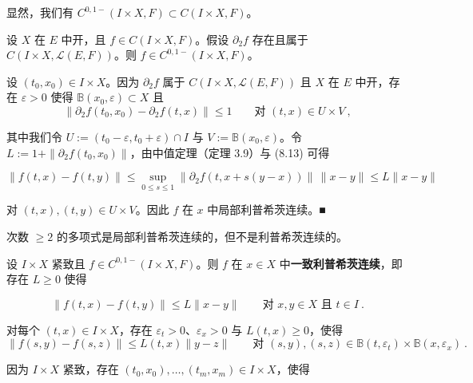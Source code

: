 \begin{remark}

\begin{items}
\item

显然，我们有 $ C^{0,1-}(I\times X,F)\subset C(I\times X,F) $。

\item

设 $ X $ 在 $ E $ 中开，且 $ f\in C(I\times X,F) $。假设 $ \partial_{2}f $ 存在且属于 $ C(I\times X,\mathcal{L}(E,F)) $。则 $ f\in C^{0,1-}(I\times X,F) $。

\proofhead
设 $ (t_{0},x_{0})\in I\times X $。因为 $ \partial_{2}f $ 属于 $ C(I\times X,\mathcal{L}(E,F)) $ 且 $ X $ 在 $ E $ 中开，存在 $ \varepsilon>0 $ 使得 $ \mathbb{B}(x_{0},\varepsilon)\subset X $ 且
\begin{equation}
\|\partial_{2}f(t_{0},x_{0})-\partial_{2}f(t,x)\|\le 1\qquad\text{对 }(t,x)\in U\times V\ ,\tag{8.13}
\end{equation}

其中我们令 $ U:=(t_{0}-\varepsilon,t_{0}+\varepsilon)\cap I $ 与 $ V:=\mathbb{B}(x_{0},\varepsilon) $。令 $ L:=1+\|\partial_{2}f(t_{0},x_{0})\| $，由中值定理（定理 3.9）与 (8.13) 可得

\[
\|f(t,x)-f(t,y)\|\le\sup_{0\le s\le 1}\|\partial_{2}f(t,x+s(y-x))\|\,\|x-y\|\le L\|x-y\|
\]

对 $ (t,x),(t,y)\in U\times V $。因此 $ f $ 在 $ x $ 中局部利普希茨连续。\nobreak\hspace{0.35em}■

\item

次数 $ \ge 2 $ 的多项式是局部利普希茨连续的，但不是利普希茨连续的。

\item

设 $ I\times X $ 紧致且 $ f\in C^{0,1-}(I\times X,F) $。则 $ f $ 在 $ x\in X $ 中\textbf{一致利普希茨连续}，即存在 $ L\ge 0 $ 使得

\[
\|f(t,x)-f(t,y)\|\le L\|x-y\|\qquad\text{对 }x,y\in X\text{ 且 }t\in I \ .
\]

\proofhead
对每个 $ (t,x)\in I\times X $，存在 $ \varepsilon_{t}>0 $、$ \varepsilon_{x}>0 $ 与 $ L(t,x)\ge 0 $，使得
\[
\|f(s,y)-f(s,z)\|\le L(t,x)\|y-z\|\qquad\text{对 }(s,y),(s,z)\in\mathbb{B}(t,\varepsilon_{t})\times\mathbb{B}(x,\varepsilon_{x}) \ .
\]

因为 $ I\times X $ 紧致，存在 $ (t_{0},x_{0}),\ldots,(t_{m},x_{m})\in I\times X $，使得


\end{items}
\end{remark}
